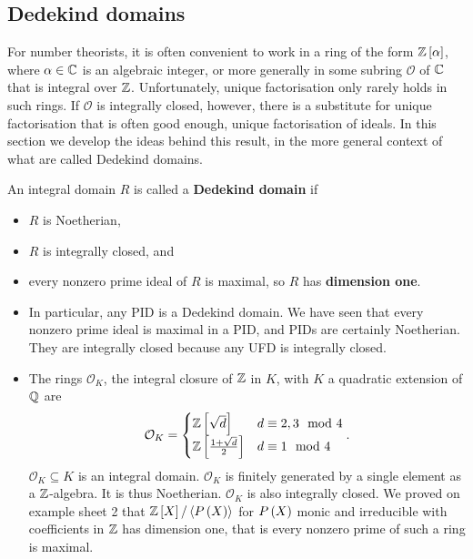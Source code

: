 \subsection{Dedekind domains}

For number theorists, it is often convenient to work in a ring of the form $ \mathbb{Z}\left[ \alpha \right] $, where $ \alpha \in \mathbb{C} $ is an algebraic integer, or more generally in some subring $ \mathcal{O} $ of $ \mathbb{C} $ that is integral over $ \mathbb{Z} $. Unfortunately, unique factorisation only rarely holds in such rings. If $ \mathcal{O} $ is integrally closed, however, there is a substitute for unique factorisation that is often good enough, unique factorisation of ideals. In this section we develop the ideas behind this result, in the more general context of what are called Dedekind domains.

\begin{definition}
An integral domain $ R $ is called a \textbf{Dedekind domain} if
\begin{itemize}
\item $ R $ is Noetherian,
\item $ R $ is integrally closed, and
\item every nonzero prime ideal of $ R $ is maximal, so $ R $ has \textbf{dimension one}.
\end{itemize}
\end{definition}

\begin{example2}
\hfill
\begin{itemize}
\item In particular, any PID is a Dedekind domain. We have seen that every nonzero prime ideal is maximal in a PID, and PIDs are certainly Noetherian. They are integrally closed because any UFD is integrally closed.
\item The rings $ \mathcal{O}_K $, the integral closure of $ \mathbb{Z} $ in $ K $, with $ K $ a quadratic extension of $ \mathbb{Q} $ are
$$ \mathcal{O}_K = \begin{cases}
\mathbb{Z}\left[ \sqrt{d} \right] & d \equiv 2, 3 \mod 4 \\
\mathbb{Z}\left[ \tfrac{1 + \sqrt{d}}{2} \right] & d \equiv 1 \mod 4
\end{cases}. $$
$ \mathcal{O}_K \subseteq K $ is an integral domain. $ \mathcal{O}_K $ is finitely generated by a single element as a $ \mathbb{Z} $-algebra. It is thus Noetherian. $ \mathcal{O}_K $ is also integrally closed. We proved on example sheet 2 that $ \mathbb{Z}\left[ X \right] / \left\langle P\left( X \right) \right\rangle $ for $ P\left( X \right) $ monic and irreducible with coefficients in $ \mathbb{Z} $ has dimension one, that is every nonzero prime of such a ring is maximal.
\end{itemize}
\end{example2}

